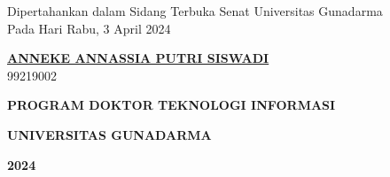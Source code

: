 \begin{center}
\vspace{0.5cm}

\begin{small}Dipertahankan dalam Sidang Terbuka Senat Universitas Gunadarma\\
Pada Hari Rabu, 3 April 2024 \\ \end{small}



\vspace{1.5cm}

{\large \underline{\textbf{{ANNEKE ANNASSIA PUTRI SISWADI}}}\\

 \vspace{0.1cm}99219002}


\vspace{1cm}


{\fontsize{14}{48} \selectfont \textbf{PROGRAM DOKTOR TEKNOLOGI INFORMASI}}%

{\fontsize{14}{48} \selectfont \textbf{UNIVERSITAS GUNADARMA}} %

{\fontsize{14}{48} \selectfont \textbf{2024}}




\end{center} 
